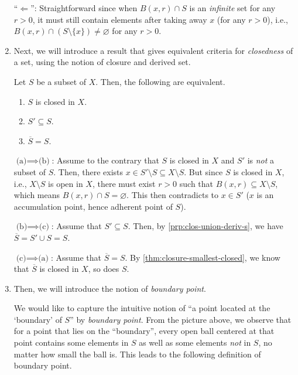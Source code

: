 \begin{enumerate}
\begin{pf}
``\(\Leftarrow\)'': Straightforward since when \(B(x,r)\cap S\) is an
\emph{infinite} set for any \(r>0\), it must still contain elements after
taking away \(x\) (for any \(r>0\)), i.e., \(B(x,r)\cap
(S\setminus\{x\})\ne\varnothing\) for any \(r>0\).
\end{pf}

\item Next, we will introduce a result that gives equivalent criteria for
\emph{closedness} of a set, using the notion of closure and derived set.

\begin{proposition}
\label{prp:equiv-crit-closed}
Let \(S\) be a subset of \(X\). Then, the following are equivalent.
\begin{enumerate}
\item \(S\) is closed in \(X\).
\item \(S'\subseteq S\).
\item \(\overline{S}=S\).
\end{enumerate}
\end{proposition}
\begin{pf}
\underline{\(\text{(a)}\implies \text{(b)}\)}: Assume to the contrary that
\(S\) is closed in \(X\) and \(S'\) is \emph{not} a subset of \(S\). Then,
there exists \(x\in S'\setminus S\subseteq X\setminus S\). But since \(S\) is
closed in \(X\), i.e., \(X\setminus S\) is open in \(X\), there must exist
\(r>0\) such that \(B(x,r)\subseteq X\setminus S\), which means \(B(x,r)\cap
S=\varnothing\). This then contradicts to \(x\in S'\) (\(x\) is an accumulation
point, hence adherent point of \(S\)).

\underline{\(\text{(b)}\implies \text{(c)}\)}: Assume that \(S'\subseteq S\).
Then, by \cref{prp:clos-union-deriv-s}, we have \(\overline{S}=S'\cup S=S\).

\underline{\(\text{(c)}\implies \text{(a)}\)}: Assume that \(\overline{S}=S\).
By \cref{thm:closure-smallest-closed}, we know that \(\overline{S}\) is closed
in \(X\), so does \(S\).
\end{pf}

\item Then, we will introduce the notion of \emph{boundary point}.
\begin{center}
\end{center}
We would like to capture the intuitive notion of ``a point located at the
`boundary' of \(S\)'' by \emph{boundary point}. From the picture above, we
observe that for a point that lies on the ``boundary'', every open ball
centered at that point contains some elements in \(S\) as well as some elements
\emph{not} in \(S\), no matter how small the ball is. This leads to the
following definition of boundary point.


\end{enumerate}
